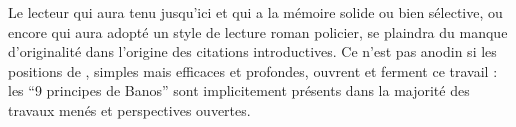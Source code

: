 Le lecteur qui aura tenu jusqu'ici et qui a la mémoire solide ou bien sélective, ou encore qui aura adopté un style de lecture roman policier, se plaindra du manque d'originalité dans l'origine des citations introductives. Ce n'est pas anodin si les positions de , simples mais efficaces et profondes, ouvrent et ferment ce travail : les ``9 principes de Banos'' sont implicitement présents dans la majorité des travaux menés et perspectives ouvertes. 








































